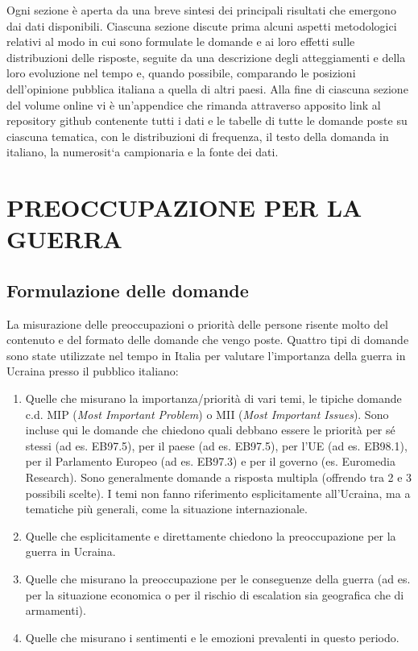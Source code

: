 \documentclass[
  openany]{book}
\begin{document}
Ogni sezione è aperta da una breve sintesi dei principali risultati che emergono dai
dati disponibili. Ciascuna sezione discute prima alcuni aspetti metodologici relativi al
modo in cui sono formulate le domande e ai loro effetti sulle distribuzioni delle risposte,
seguite da una descrizione degli atteggiamenti e della loro evoluzione nel tempo e,
quando possibile, comparando le posizioni dell'opinione pubblica italiana a quella di
altri paesi. Alla fine di ciascuna sezione del volume online vi è un'appendice che rimanda
attraverso apposito link al repository github contenente tutti i dati e le tabelle di tutte
le domande poste su ciascuna tematica, con le distribuzioni di frequenza, il testo della
domanda in italiano, la numerosit`a campionaria e la fonte dei dati.

\hypertarget{preoccupazione-per-la-guerra}{%
\chapter{PREOCCUPAZIONE PER LA GUERRA}\label{preoccupazione-per-la-guerra}}

\hypertarget{formulazione-delle-domande}{%
\section{Formulazione delle domande}\label{formulazione-delle-domande}}

La misurazione delle preoccupazioni o priorità delle persone risente molto del contenuto e del formato delle domande che vengo poste. Quattro tipi di domande sono state utilizzate nel tempo in Italia per valutare l'importanza della guerra in Ucraina presso il pubblico italiano:

\begin{enumerate}
\def\labelenumi{\alph{enumi})}
\item
  Quelle che misurano la importanza/priorità di vari temi, le tipiche domande c.d. MIP (\emph{Most Important Problem}) o MII (\emph{Most Important Issues}). Sono incluse qui le domande che chiedono quali debbano essere le priorità per sé stessi (ad es. EB97.5), per il paese (ad es. EB97.5), per l'UE (ad es. EB98.1), per il Parlamento Europeo (ad es. EB97.3) e per il governo (es. Euromedia Research). Sono generalmente domande a risposta multipla (offrendo tra 2 e 3 possibili scelte). I temi non fanno riferimento esplicitamente all'Ucraina, ma a tematiche più generali, come la situazione internazionale.
\item
  Quelle che esplicitamente e direttamente chiedono la preoccupazione per la guerra in Ucraina.
\item
  Quelle che misurano la preoccupazione per le conseguenze della guerra (ad es. per la situazione economica o per il rischio di escalation sia geografica che di armamenti).
\item
  Quelle che misurano i sentimenti e le emozioni prevalenti in questo periodo.
\end{enumerate}
\end{document}
